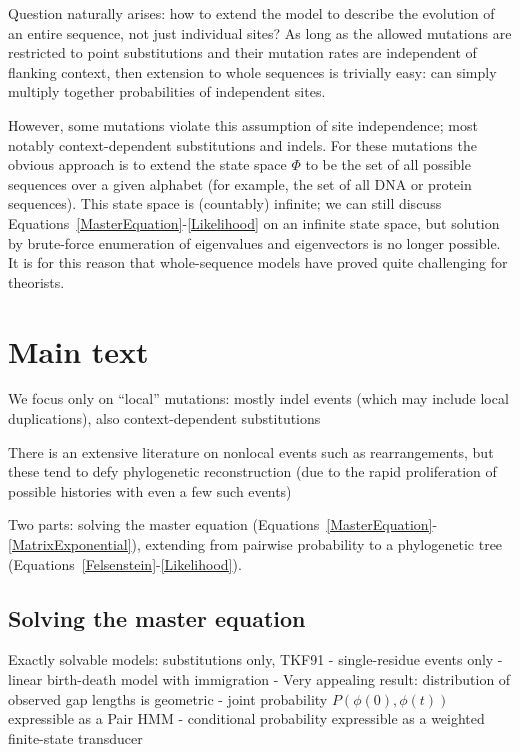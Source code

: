 \documentclass{bmcart}
\begin{document}
Question naturally arises: how to extend the model to describe the evolution of an entire sequence,
not just individual sites?
As long as the allowed mutations are restricted to point substitutions
and their mutation rates are independent of flanking context,
then extension to whole sequences is trivially easy:
can simply multiply together probabilities of independent sites.

However, some mutations violate this assumption of site independence;
most notably context-dependent substitutions and indels.
For these mutations the obvious approach is to extend the state space $\Phi$
to be the set of all possible sequences over a given alphabet
(for example, the set of all DNA or protein sequences).
This state space is (countably) infinite;
we can still discuss Equations~\ref{MasterEquation}-\ref{Likelihood}
on an infinite state space,
but solution by brute-force enumeration of eigenvalues and eigenvectors is no longer possible.
It is for this reason that whole-sequence models have proved quite challenging for theorists.

\section*{Main text}

We focus only on ``local'' mutations: mostly indel events (which may include local duplications),
also context-dependent substitutions

There is an extensive literature on nonlocal events such as rearrangements,
but these tend to defy phylogenetic reconstruction (due to the rapid proliferation of possible histories with even a few such events)

Two parts:
solving the master equation (Equations~\ref{MasterEquation}-\ref{MatrixExponential}),
extending from pairwise probability to a phylogenetic tree (Equations~\ref{Felsenstein}-\ref{Likelihood}).

\subsection*{Solving the master equation}

Exactly solvable models:
substitutions only,
TKF91
 - single-residue events only
 - linear birth-death model with immigration
 - Very appealing result: distribution of observed gap lengths is geometric
 - joint probability $P(\phi(0),\phi(t))$ expressible as a Pair HMM \cite{HolmesBruno2001}
 - conditional probability expressible as a weighted finite-state transducer \cite{Holmes2003,Westesson2012-zg,BouchardCote2013}
\end{document}
